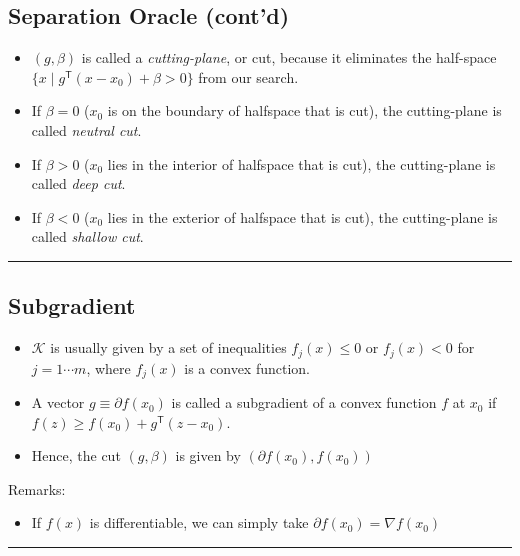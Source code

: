 \documentclass[
]{article}
\providecommand{\tightlist}{%
  \setlength{\itemsep}{0pt}\setlength{\parskip}{0pt}}
\begin{document}
\subsection{Separation Oracle (cont'd)}\label{separation-oracle-contd}

\begin{itemize}
\item
  \((g, \beta)\) is called a \emph{cutting-plane}, or cut, because it
  eliminates the half-space
  \(\{x \mid g^\mathsf{T} (x - x_0) + \beta > 0\}\) from our search.
\item
  If \(\beta=0\) (\(x_0\) is on the boundary of halfspace that is cut),
  the cutting-plane is called \emph{neutral cut}.
\item
  If \(\beta>0\) (\(x_0\) lies in the interior of halfspace that is
  cut), the cutting-plane is called \emph{deep cut}.
\item
  If \(\beta<0\) (\(x_0\) lies in the exterior of halfspace that is
  cut), the cutting-plane is called \emph{shallow cut}.
\end{itemize}

\begin{center}\rule{0.5\linewidth}{0.5pt}\end{center}

\subsection{Subgradient}\label{subgradient}

\begin{itemize}
\item
  \(\mathcal{K}\) is usually given by a set of inequalities
  \(f_j(x) \le 0\) or \(f_j(x) < 0\) for \(j = 1 \cdots m\), where
  \(f_j(x)\) is a convex function.
\item
  A vector \(g \equiv \partial f(x_0)\) is called a subgradient of a
  convex function \(f\) at \(x_0\) if
  \(f(z) \geq f(x_0) + g^\mathsf{T} (z - x_0)\).
\item
  Hence, the cut \((g, \beta)\) is given by
  \((\partial f(x_0), f(x_0))\)
\end{itemize}

Remarks:

\begin{itemize}
\tightlist
\item
  If \(f(x)\) is differentiable, we can simply take
  \(\partial f(x_0) = \nabla f(x_0)\)
\end{itemize}

\begin{center}\rule{0.5\linewidth}{0.5pt}\end{center}
\end{document}
